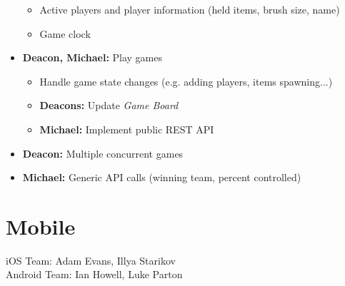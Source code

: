 \documentclass[oneside,12pt]{scrbook}
\begin{document}
\begin{itemize}
\begin{itemize}
            \item Active players and player information (held items, brush size, name)
            \item Game clock
        \end{itemize}
    \item \textbf{Deacon, Michael:} Play games
        \begin{itemize}
            \item Handle game state changes (e.g. adding players, items spawning...)
            \item \textbf{Deacons:} Update \emph{Game Board}
            \item \textbf{Michael:} Implement public REST API
        \end{itemize}
    \item \textbf{Deacon:} Multiple concurrent games
    \item \textbf{Michael:} Generic API calls (winning team, percent controlled)
\end{itemize}

\chapter{Mobile}
iOS Team: Adam Evans, Illya Starikov\\
Android Team: Ian Howell, Luke Parton
\end{document}
